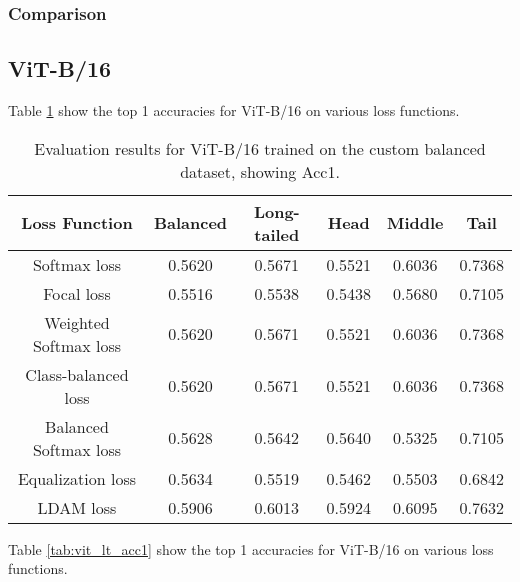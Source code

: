 \subsubsection{Comparison}


\subsection{ViT-B/16}

Table \ref{tab:vit_bal_acc1_1} show the top 1 accuracies for ViT-B/16 on various loss functions.

\begin{table}[H]
    \centering
    \begin{tabular}{cccccc}
        \toprule
        Loss Function & Balanced & Long-tailed & Head & Middle & Tail \\ 
        \midrule
        Softmax loss   & 0.5620 & 0.5671 & 0.5521 & 0.6036 & 0.7368 \\
        Focal loss   & 0.5516 & 0.5538 & 0.5438 & 0.5680 & 0.7105 \\
        Weighted Softmax loss   & 0.5620 & 0.5671 & 0.5521 & 0.6036 & 0.7368 \\
        Class-balanced loss   & 0.5620 & 0.5671 &  0.5521 & 0.6036 & 0.7368 \\
        Balanced Softmax loss   & 0.5628 & 0.5642 & 0.5640 & 0.5325 & 0.7105 \\
        Equalization loss   & 0.5634   & 0.5519 & 0.5462 & 0.5503 & 0.6842 \\
        LDAM loss   & 0.5906 &  0.6013 & 0.5924 & 0.6095 & 0.7632 \\
        \bottomrule
    \end{tabular}
    \caption{Evaluation results for ViT-B/16 trained on the custom balanced dataset, showing Acc1.}
    \label{tab:vit_bal_acc1_1}
\end{table}

Table \ref{tab:vit_lt_acc1} show the top 1 accuracies for ViT-B/16 on various loss functions.

